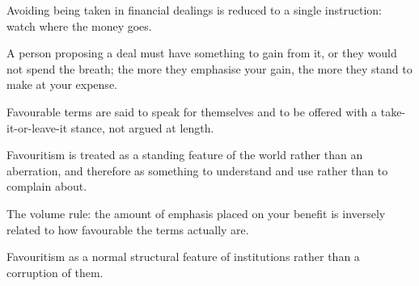 

\begin{distilled}
  \item Avoiding being taken in financial dealings is reduced to a single instruction: watch where the money goes.
  \item A person proposing a deal must have something to gain from it, or they would not spend the breath; the more they emphasise your gain, the more they stand to make at your expense.
  \item Favourable terms are said to speak for themselves and to be offered with a take-it-or-leave-it stance, not argued at length.
  \item Favouritism is treated as a standing feature of the world rather than an aberration, and therefore as something to understand and use rather than to complain about.
\end{distilled}

\begin{unique}
  \item The volume rule: the amount of emphasis placed on your benefit is inversely related to how favourable the terms actually are.
  \item Favouritism as a normal structural feature of institutions rather than a corruption of them.
\end{unique}
